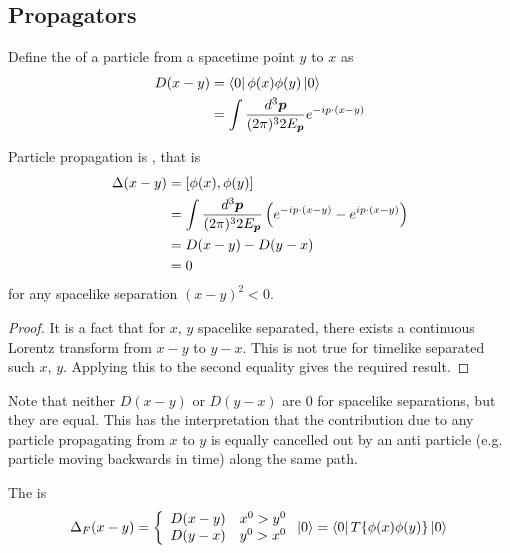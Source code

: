 \documentclass{article}
\begin{document}
\subsection{Propagators}

\begin{definition}[Propagator]
Define the  of a particle from a spacetime point $y$ to $x$ as 
\begin{align*}
D(x-y) &= \bra{0} \phi(x) \phi(y) \ket{0} \\
  &= \int \LImeas e^{-ip\cdot(x-y)}
\end{align*}
\end{definition}

\begin{theorem}
Particle propagation is , that is 
\begin{align*}
    \Delta(x-y) &= \comm[\phi(x)]{\phi(y)} \\
     &= \int \LImeas \left( e^{-ip\cdot(x-y)} - e^{ip\cdot(x-y)} \right) \\
     &= D(x-y) - D(y-x) \\
     &= 0 
\end{align*}
for any spacelike separation $(x-y)^2 <0$. 
\end{theorem}
\begin{proof}
It is a fact that for $x$, $y$ spacelike separated, there exists a continuous Lorentz transform from $x-y$ to $y-x$. This is not true for timelike separated such $x$, $y$. Applying this to the second equality gives the required result. 
\end{proof}

\begin{idea}
Note that neither $D(x-y)$ or $D(y-x)$ are $0$ for spacelike separations, but they are equal. This has the interpretation that the contribution due to any particle propagating from $x$ to $y$ is equally cancelled out by an anti particle (e.g. particle moving backwards in time) along the same path.
\end{idea}

\begin{definition}
The  is 
\[
\Delta_F(x-y) = \left\{ \begin{array}{lc} D(x-y) & x^0 > y^0 \\
    D(y-x) & y^0 > x^0 
    \end{array} \right. \ket{0} = \bra{0} T\{\phi(x) \phi(y) \} \ket{0} \\
\]
\end{definition}
\end{document}
